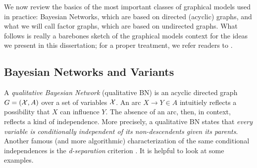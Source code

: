 We now review the basics of the most important classes of graphical models used in practice:
Bayesian Networks, which are based on directed (acyclic) graphs, and
what we will call factor graphs, which are based on undirected graphs. 
What follows is really a barebones sketch of the graphical models context for the ideas we present in this dissertation; for a proper treatment, we refer readers to 
    \citet{KF09}.
    
\subsection{Bayesian Networks and Variants}
    \label{sec:prelim-bns}

A \emph{qualitative Bayesian Network} (qualitative BN) is an acyclic directed graph $G = (\mathcal X, A)$ over a set of variables $\mathcal X$. 
An arc $X {\to} Y \in A$ intuitiely reflects a possibility that $X$ can influence $Y$. 
The absence of an arc, then, in context, reflects a kind of 
    independence. 
More precisely, a qualitative BN states that
\textit{every variable is conditionally independent of its non-descendents given its parents}.
Another famous (and more algorithmic) characterization of the same conditional independences is the \emph{d-separation} criterion  \citep{geiger-pearl-d-separation}. 
It is helpful to look at some examples.

